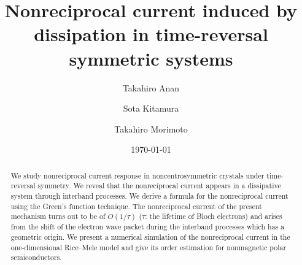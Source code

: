 \documentclass[twocolumn,superscriptaddress]{revtex4-1}
\begin{document}
\title{Nonreciprocal current induced by dissipation in time-reversal symmetric systems
}
\author{Takahiro Anan}
\author{Sota Kitamura}
\author{Takahiro Morimoto}
\date{\today}
\begin{abstract}
We study nonreciprocal current response in noncentrosymmetric crystals under time-reversal symmetry.
We reveal that the nonreciprocal current appears in a dissipative system through interband processes.
We derive a formula for the nonreciprocal current using the Green's function technique.
The nonreciprocal current of the present mechanism turns out to be of $O(1/\tau)$ ($\tau$: the lifetime of Bloch electrons) and arises from the shift of the electron wave packet during the interband processes which has a geometric origin.
We present a numerical simulation of the nonreciprocal current in the one-dimensional Rice--Mele model and give its order estimation for nonmagnetic polar semiconductors.
\end{abstract}
\maketitle
\end{document}
